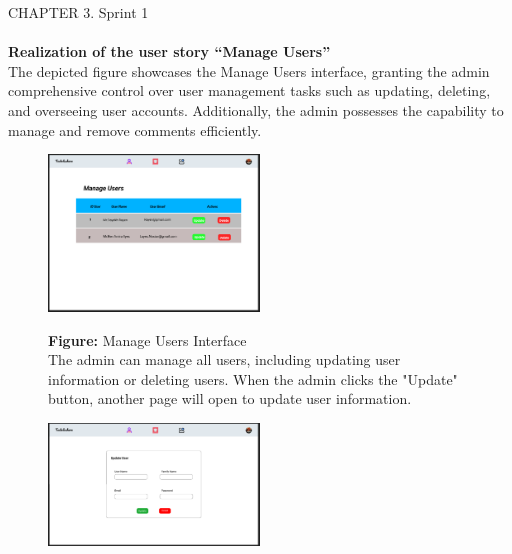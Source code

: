 \documentclass{article}
\begin{document}
{{{{{{{{\newpage
\noindent
CHAPTER 3.  Sprint 1 \\
\underline{\hspace{\textwidth}} \vspace{0.2cm}
\\\textbf{Realization of the user story “Manage Users”}\\
The depicted figure showcases the Manage Users interface, granting the admin comprehensive control over user management tasks such as updating, deleting, and overseeing user accounts. Additionally, the admin possesses the capability to manage and remove comments efficiently.\\
\begin{figure}[htbp]
    \centering
    \includegraphics[width=0.5\textwidth]{ManageUser} 
    \vspace{0.5cm}
    
    \textbf{Figure:} Manage Users Interface \\
    The admin can manage all users, including updating user information or deleting users. When the admin clicks the "Update" button, another page will open to update user information.
\end{figure}

\begin{figure}[htbp]
    \centering
    \includegraphics[width=0.5\textwidth]{UpdateUser} 
    \vspace{0.5cm}
    

\end{figure}}}}}}}}}
\end{document}

